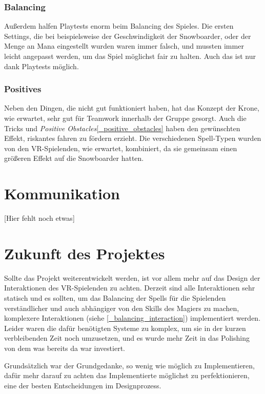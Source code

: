 \subsubsection{Balancing}

Außerdem halfen Playtests enorm beim Balancing des Spieles. Die ersten Settings, die bei beispielsweise der Geschwindigkeit der Snowboarder, oder der Menge an Mana eingestellt wurden waren immer falsch, und mussten immer leicht angepasst werden, um das Spiel möglichst fair zu halten. Auch das ist nur dank Playtests möglich.

\subsubsection{Positives}

Neben den Dingen, die nicht gut funktioniert haben, hat das Konzept der Krone, wie erwartet, sehr gut für Teamwork innerhalb der Gruppe gesorgt. Auch die Tricks und \emph{Positive Obstacles}\ref{_positive_obstacles} haben den gewünschten Effekt, riskantes fahren zu fördern erzieht. Die verschiedenen Spell-Typen wurden von den VR-Spielenden, wie erwartet, kombiniert, da sie gemeinsam einen größeren Effekt auf die Snowboarder hatten.

\section{Kommunikation}
[Hier fehlt noch etwas]

\section{Zukunft des Projektes}

Sollte das Projekt weiterentwickelt werden, ist vor allem mehr auf das Design der Interaktionen des VR-Spielenden zu achten. Derzeit sind alle Interaktionen sehr statisch und es sollten, um das Balancing der Spells für die Spielenden verständlicher und auch abhängiger von den Skills des Magiers zu machen, komplexere Interaktionen (siehe \ref{_balancing_interaction}) implementiert werden. Leider waren die dafür benötigten Systeme zu komplex, um sie in der kurzen verbleibenden Zeit noch umzusetzen, und es wurde mehr Zeit in das Polishing von dem was bereits da war investiert.

Grundsätzlich war der Grundgedanke, so wenig wie möglich zu Implementieren, dafür mehr darauf zu achten das Implementierte möglichst zu perfektionieren, eine der besten Entscheidungen im Designprozess.